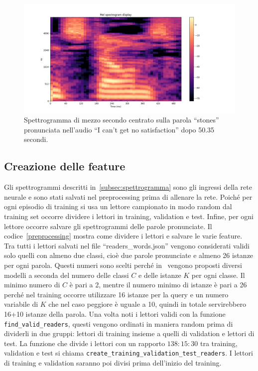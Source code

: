 \documentclass[12pt,a4paper,titlepage]{article}
\begin{document}
\begin{figure}[h]
	\centering	
	\includegraphics[width=1\textwidth]{../Stones_spectrogram}
	\caption{Spettrogramma di mezzo secondo centrato sulla parola ``stones'' pronunciata nell'audio ``I can't get no satisfaction'' dopo 50.35 secondi.}
	\label{fig:stones_spec}
\end{figure}


\subsection{Creazione delle feature}
\label{subsec:creazione_feature}
Gli spettrogrammi descritti in~\ref{subsec:spettrogramma} sono gli ingressi della rete neurale e sono stati salvati nel preprocessing prima di allenare la rete. Poiché per ogni episodio di training si usa un lettore campionato in modo random dal training set occorre dividere i lettori in training, validation e test. Infine, per ogni lettore occorre salvare gli spettrogrammi delle parole pronunciate. Il codice~\ref{preprocessing} mostra come dividere i lettori e salvare le varie feature. Tra tutti i lettori salvati nel file ``readers\_words.json'' vengono considerati validi solo quelli con almeno due classi, cioè due parole pronunciate e almeno 26 istanze per ogni parola. Questi numeri sono scelti perché in~\cite{Salamon:Few-Shot} vengono proposti diversi modelli a seconda del numero delle classi $C$ e delle istanze $K$ per ogni classe. Il minimo numero di $C$ è pari a 2, mentre il numero minimo di istanze è pari a 26 perché nel training occorre utilizzare 16 istanze per la query e un numero variabile di $K$ che nel caso peggiore è uguale a 10, quindi in totale servirebbero 16+10 istanze della parola. Una volta noti i lettori validi con la funzione \texttt{find\_valid\_readers}, questi vengono ordinati in maniera random prima di dividerli in due gruppi: lettori di training insieme a quelli di validation e lettori di test. La funzione che divide i lettori con un rapporto $138:15:30$ tra training, validation e test si chiama \texttt{create\_training\_validation\_test\_readers}.
I lettori di training e validation saranno poi divisi prima dell'inizio del training.
\end{document}
